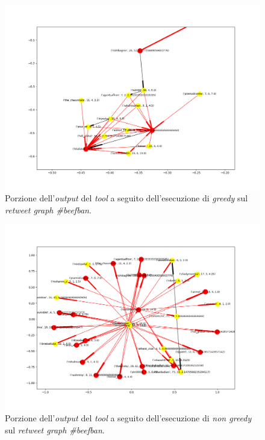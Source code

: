 \begin{figure}
\begin{center}
\includegraphics[scale=0.5]{images/beefban_in_degree_greedy_probability_free.png}
\end{center}
\caption{Porzione dell'\textit{output} del \textit{tool} a seguito dell'esecuzione di \textit{greedy} sul \textit{retweet graph \#beefban}.}
\label{fig:beefgreedy}
\end{figure}

\begin{figure}
\begin{center}
\includegraphics[scale=0.5]{images/beefban_in_degree_probability_free.png}
\end{center}
\caption{Porzione dell'\textit{output} del \textit{tool} a seguito dell'esecuzione di \textit{non greedy} sul \textit{retweet graph \#beefban}.}
\label{fig:beefnotgreedy}
\end{figure}

